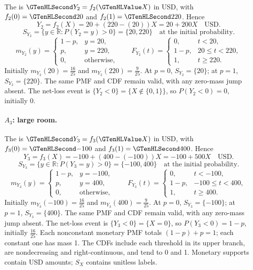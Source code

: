 The  is $\Money{Y_2}=f_2(\Indicator{X})$ in USD, with $f_2(0)=\Money{20}$ and $f_2(1)=\Money{220}$. Hence
\[Y_2=f_2(X)=20+(220-(20))X=20+200X\quad\text{USD}.\]
\[S_{Y_2}=\{y\in\mathbb R:P(Y_2=y)>0\}=\{20,220\}\quad\text{at the initial probability}.\]
\[m_{Y_2}(y)=\begin{cases}1-p,&y=20,\\p,&y=220,\\0,&\text{otherwise},\end{cases}\qquad F_{Y_2}(t)=\begin{cases}0,&t<20,\\1-p,&20\leq t<220,\\1,&t\geq 220.\end{cases}\]
Initially $m_{Y_2}(20)=\frac{16}{25}$ and $m_{Y_2}(220)=\frac{9}{25}$. At $p=0$, $S_{Y_2}=\{20\}$; at $p=1$, $S_{Y_2}=\{220\}$. The same PMF and CDF remain valid, with any zero-mass jump absent.
The net-loss event is $\{Y_2<0\}=\{X\notin\{0,1\}\}$, so $P(Y_2<0)=0$, initially $0$.
\paragraph{$A_3$: large room.}
The  is $\Money{Y_3}=f_3(\Indicator{X})$ in USD, with $f_3(0)=\Money{-100}$ and $f_3(1)=\Money{400}$. Hence
\[Y_3=f_3(X)=-100+(400-(-100))X=-100+500X\quad\text{USD}.\]
\[S_{Y_3}=\{y\in\mathbb R:P(Y_3=y)>0\}=\{-100,400\}\quad\text{at the initial probability}.\]
\[m_{Y_3}(y)=\begin{cases}1-p,&y=-100,\\p,&y=400,\\0,&\text{otherwise},\end{cases}\qquad F_{Y_3}(t)=\begin{cases}0,&t<-100,\\1-p,&-100\leq t<400,\\1,&t\geq 400.\end{cases}\]
Initially $m_{Y_3}(-100)=\frac{16}{25}$ and $m_{Y_3}(400)=\frac{9}{25}$. At $p=0$, $S_{Y_3}=\{-100\}$; at $p=1$, $S_{Y_3}=\{400\}$. The same PMF and CDF remain valid, with any zero-mass jump absent.
The net-loss event is $\{Y_3<0\}=\{X=0\}$, so $P(Y_3<0)=1-p$, initially $\frac{16}{25}$.
Each nonconstant monetary PMF totals $(1-p)+p=1$; each constant one has mass 1. The CDFs include each threshold in its upper branch, are nondecreasing and right-continuous, and tend to 0 and 1. Monetary supports contain USD amounts; $S_X$ contains unitless labels.

